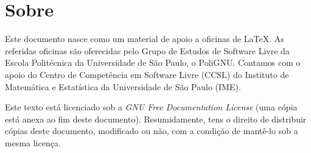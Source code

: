 \section*{Sobre}

Este documento nasce como um material de apoio a oficinas de
\LaTeX. As referidas oficinas são oferecidas pelo Grupo de Estudos de
Software Livre da Escola Politécnica da Universidade de São Paulo, o
PoliGNU. Contamos com o apoio do Centro de Competência em Software Livre (CCSL) do Instituto de Matemática e Estatística da Universidade de São Paulo (IME).

Este texto está licenciado sob a \emph{GNU Free
Documentation License} (uma cópia está anexa ao fim deste documento).
Resumidamente, tens o direito de distribuir cópias deste documento,
modificado ou não, com a condição de mantê-lo sob a mesma licença.

\clearpage
